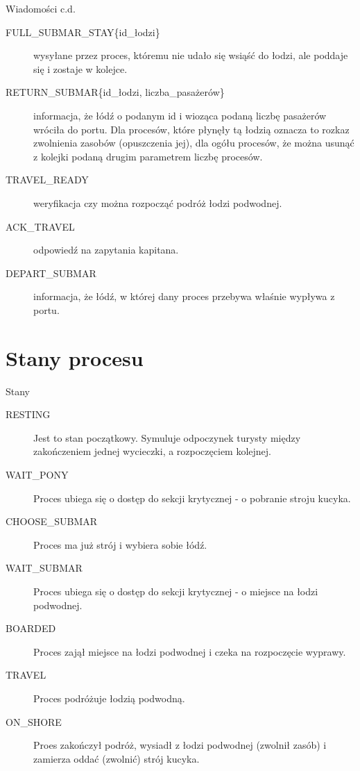 \documentclass{beamer}
\begin{document}
\begin{frame}{Wiadomości c.d.}
    \internallinenumbers
    \resetlinenumber[1]
    \begin{description}
        \item [FULL\_SUBMAR\_STAY\{id\_łodzi\}] wysyłane przez proces, któremu nie udało się wsiąść do łodzi, ale poddaje się i zostaje w kolejce.
        \item [RETURN\_SUBMAR\{id\_łodzi, liczba\_pasażerów\}] informacja, że łódź o podanym id i wioząca podaną liczbę pasażerów wróciła do portu. Dla procesów, które płynęły tą łodzią oznacza to rozkaz zwolnienia zasobów (opuszczenia jej), dla ogółu procesów, że można usunąć z kolejki podaną drugim parametrem liczbę procesów.
        \item [TRAVEL\_READY] weryfikacja czy można rozpocząć podróż łodzi podwodnej.
        \item [ACK\_TRAVEL] odpowiedź na zapytania kapitana.
        \item [DEPART\_SUBMAR] informacja, że łódź, w której dany proces przebywa właśnie wypływa z portu.
    \end{description}
\end{frame}

\section{Stany procesu}
\begin{frame}{Stany}
    \internallinenumbers
    \resetlinenumber[1]
    \begin{description}
        \item [RESTING] Jest to stan początkowy. Symuluje odpoczynek turysty między zakończeniem jednej wycieczki, a rozpoczęciem kolejnej.
        \item [WAIT\_PONY] Proces ubiega się o dostęp do sekcji krytycznej - o pobranie stroju kucyka.
        \item [CHOOSE\_SUBMAR] Proces ma już strój i wybiera sobie łódź.
        \item [WAIT\_SUBMAR] Proces ubiega się o dostęp do sekcji krytycznej - o miejsce na łodzi podwodnej.
        \item [BOARDED] Proces zajął miejsce na łodzi podwodnej i czeka na rozpoczęcie wyprawy.
        \item [TRAVEL] Proces podróżuje łodzią podwodną.
        \item [ON\_SHORE] Proes zakończył podróż, wysiadł z łodzi podwodnej (zwolnił zasób) i zamierza oddać (zwolnić) strój kucyka.
    \end{description}

\end{frame}
\end{document}
